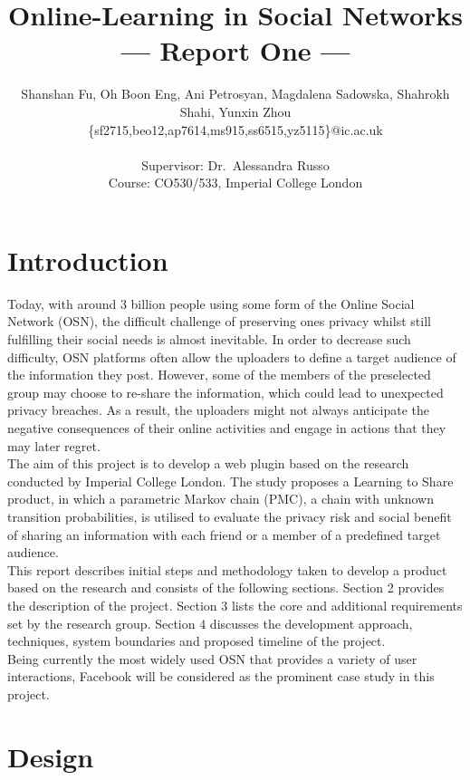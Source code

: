 \documentclass[a4paper,11pt]{article}
\title{Online-Learning in Social Networks\\\Large{--- Report One ---}}
\author{Shanshan Fu, Oh Boon Eng, Ani Petrosyan, Magdalena Sadowska,
  Shahrokh Shahi, Yunxin Zhou\\
       \{sf2715,beo12,ap7614,ms915,ss6515,yz5115\}@ic.ac.uk\\ \\
       \small{Supervisor: Dr.\ Alessandra Russo}\\
       \small{Course: CO530/533, Imperial College London}
}
\begin{document}
\maketitle

\section{Introduction}

Today, with around 3 billion people using some form of the Online Social Network (OSN)\cite{InternetUsers}, the difficult challenge of preserving one\textquotesingle s privacy whilst still fulfilling their social needs is almost inevitable. In order to decrease such difficulty, OSN platforms often allow the uploaders to define a target audience of the information they post. However, some of the members of the preselected group may choose to re-share the information, which could lead to unexpected privacy breaches\cite{PrivacyBreaches}. As a result, the uploaders might not always anticipate the negative consequences of their online activities and engage in actions that they may later regret\cite{FacebookRegret, ShareRegret}.\\
\indent The aim of this project is to develop a web plugin based on the research conducted by Imperial College London. The study proposes a Learning to Share product, in which a parametric Markov chain (PMC), a chain with unknown transition probabilities, is utilised to evaluate the privacy risk and social benefit of sharing an information with each friend or a member of a predefined target audience.\\
\indent This report describes initial steps and methodology taken to develop a product based on the research and consists of the following sections. Section 2 provides the description of the project. Section 3 lists the core and additional requirements set by the research group. Section 4 discusses the development approach, techniques, system boundaries and proposed timeline of the project.\\
\indent Being currently the most widely used OSN that provides a variety of user interactions\cite{RankSN, Interactions}, Facebook will be considered as the prominent case study in this project.

\section{Design}
\end{document}
